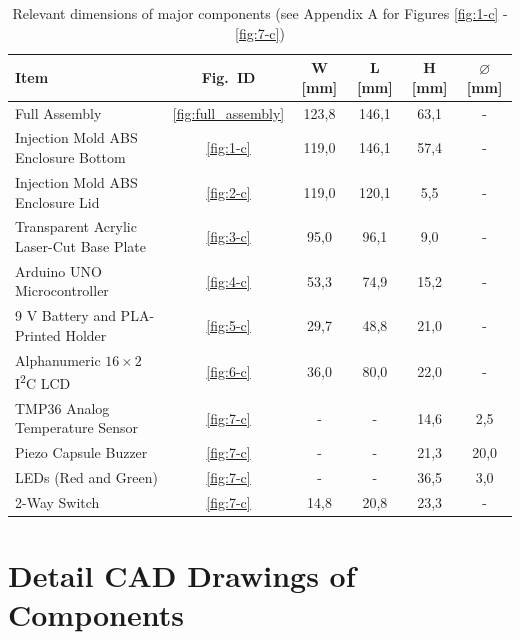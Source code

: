 \documentclass[10pt]{article}
\begin{document}
\begin{table}[H]
	\centering
	\caption{Relevant dimensions of major components (see Appendix A for Figures \ref{fig:1-c} - \ref{fig:7-c})}
	\label{tab:dim_condensed}
	\begin{tabular}{l c c c c c}
		\toprule
		Item                                               & Fig.\ ID                & W [mm] & L [mm] & H [mm] & $\diameter $ [mm] \\
		\midrule
		Full Assembly                                      & \ref{fig:full_assembly} & 123,8  & 146,1  & 63,1   & -                 \\
		Injection Mold ABS Enclosure Bottom                & \ref{fig:1-c}           & 119,0  & 146,1  & 57,4   & -                 \\
		Injection Mold ABS Enclosure Lid                   & \ref{fig:2-c}           & 119,0  & 120,1  & 5,5    & -                 \\
		Transparent Acrylic Laser-Cut Base Plate           & \ref{fig:3-c}           & 95,0   & 96,1   & 9,0    & -                 \\
		Arduino UNO Microcontroller                        & \ref{fig:4-c}           & 53,3   & 74,9   & 15,2   & -                 \\
		9 V Battery and PLA-Printed Holder                 & \ref{fig:5-c}           & 29,7   & 48,8   & 21,0   & -                 \\
		Alphanumeric $16\times2$ I\textsuperscript{2}C LCD & \ref{fig:6-c}           & 36,0   & 80,0   & 22,0   & -                 \\
		TMP36 Analog Temperature Sensor                    & \ref{fig:7-c}           & -      & -      & 14,6   & 2,5               \\
		Piezo Capsule Buzzer                               & \ref{fig:7-c}           & -      & -      & 21,3   & 20,0              \\
		LEDs (Red and Green)                               & \ref{fig:7-c}           & -      & -      & 36,5   & 3,0               \\
		2-Way Switch                                       & \ref{fig:7-c}           & 14,8   & 20,8   & 23,3   & -                 \\
		\bottomrule
	\end{tabular}
\end{table}

\section{Detail CAD Drawings of Components} \label{sec:appendixA}
\end{document}
